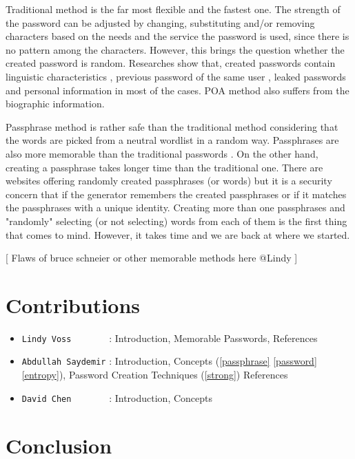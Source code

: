 \documentclass[acmsmall,nonacm]{acmart}
\begin{document}
Traditional method is the far most flexible and the fastest one. The strength of the password can be adjusted by changing, substituting and/or removing characters based on the needs and the service the password is used, since there is no pattern among the characters. However, this brings the question whether the created password is random. Researches show that, created passwords contain linguistic characteristics \cite{curran_2011}, previous password of the same user \cite{bhagavatula_2020,10.5555/3235895.3235911,das_2014}, leaked passwords \cite{das_2014} and personal information \cite{siau_2018,tulek_2020} in most of the cases. POA method also suffers from the biographic information.

Passphrase method is rather safe than the traditional method considering that the words are picked from a neutral wordlist in a random way. Passphrases are also more memorable than the traditional passwords \cite{fernandes_2021}. On the other hand, creating a passphrase takes longer time than the traditional one. There are websites offering randomly created passphrases (or words) but it is a security concern that if the generator remembers the created passphrases or if it matches the passphrases with a unique identity. Creating more than one passphrases and "randomly" selecting (or not selecting) words from each of them is the first thing that comes to mind. However, it takes time and we are back at where we started.

\textcolor{beaver}{[ Flaws of bruce schneier or other memorable methods here @Lindy ]} 

\section{Contributions}
\begin{itemize}
\item{\verb|Lindy Voss       |} : Introduction, Memorable Passwords, References
\item{\verb|Abdullah Saydemir|} : Introduction, Concepts (\ref{passphrase} \ref{password} \ref{entropy}), Password Creation Techniques (\ref{strong}) References
\item{\verb|David Chen       |} : Introduction, Concepts
\end{itemize}

\section{Conclusion}
\end{document}
